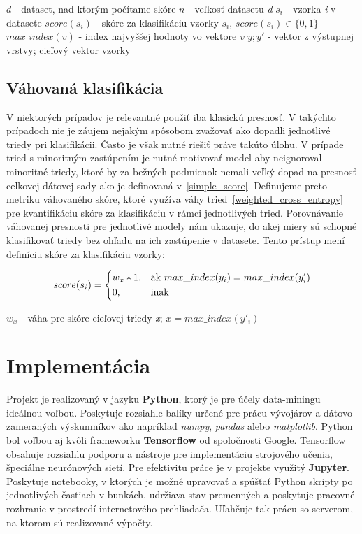 $d$ - dataset, nad ktorým počítame skóre\newline
$n$ - veľkosť datasetu \textit{d}\newline
$s_i$ - vzorka \textit{i} v datasete \newline
$score(s_i)$ - skóre za klasifikáciu vzorky $s_i$, $score(s_i) \in \{0, 1\}$\newline
$max\_index(v)$ - index najvyššej hodnoty vo vektore \textit{v}\newline
$y; y'$ - vektor z výstupnej vrstvy; cieľový vektor vzorky

\subsection{Váhovaná klasifikácia}
\label{weighted_score}

V niektorých prípadov je relevantné použiť iba klasickú presnosť. V takýchto prípadoch nie je záujem nejakým spôsobom zvažovať ako dopadli jednotlivé triedy pri klasifikácii. Často je však nutné riešiť práve takúto úlohu. V prípade tried s minoritným zastúpením je nutné motivovať model aby neignoroval minoritné triedy, ktoré by za bežných podmienok nemali veľký dopad na presnosť celkovej dátovej sady ako je definovaná v~\ref{simple_score}.\newline
Definujeme preto metriku váhovaného skóre, ktoré využíva váhy tried~\ref{weighted_cross_entropy} pre kvantifikáciu skóre za klasifikáciu v rámci jednotlivých tried. Porovnávanie váhovanej presnosti pre jednotlivé modely nám ukazuje, do akej miery sú schopné klasifikovať triedy bez ohľadu na ich zastúpenie v datasete. Tento prístup mení definíciu skóre za klasifikáciu vzorky:

\[
    score(s_i)= 
\begin{dcases}
    w_x*1,& \text{ak } max\_index(y_i) = max\_index(y'_i)\\
    0,              & \text{inak}
\end{dcases}
\]

$w_x$ - váha pre skóre cieľovej triedy \textit{x}; $x = max\_index(y'_i)$

\section{Implementácia}
\label{implementation}

Projekt je realizovaný v jazyku \textbf{Python}, ktorý je pre účely data-miningu ideálnou voľbou. Poskytuje rozsiahle balíky určené pre prácu vývojárov a dátovo zameraných výskumníkov ako napríklad \textit{numpy}, \textit{pandas} alebo \textit{matplotlib}. \newline
Python bol voľbou aj kvôli frameworku \textbf{Tensorflow} od spoločnosti Google. Tensorflow obsahuje rozsiahlu podporu a nástroje pre implementáciu strojového učenia, špeciálne neurónových sietí.\newline
Pre efektivitu práce je v projekte využitý \textbf{Jupyter}. Poskytuje notebooky, v ktorých je možné upravovať a spúšťať Python skripty po jednotlivých častiach v bunkách, udržiava stav premenných a poskytuje pracovné rozhranie v prostredí internetového prehliadača. Uľahčuje tak prácu so serverom, na ktorom sú realizované výpočty.
